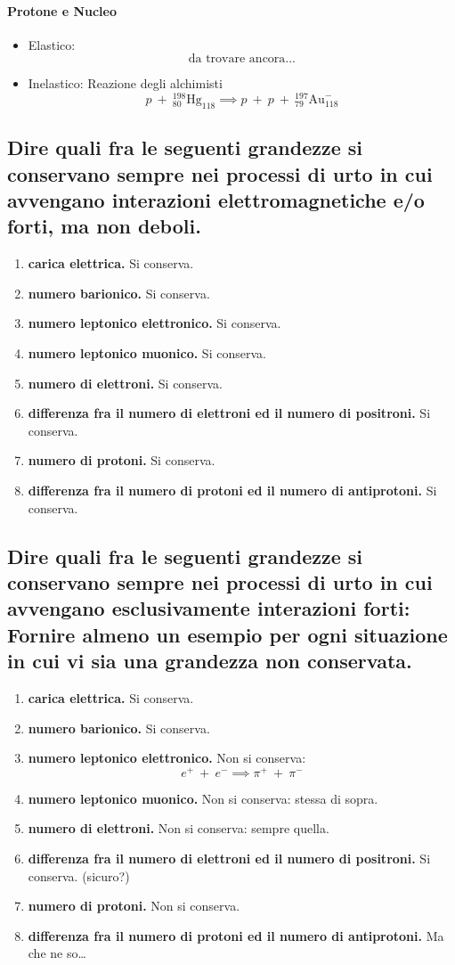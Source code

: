 \paragraph{Protone e Nucleo}
\begin{itemize}
	\item Elastico: 
	\[
		\text{da trovare ancora\ldots}
	\]
	\item Inelastico: Reazione degli alchimisti
	\[
		p \ + \ {}^{198}_{80}\text{Hg}_{118} \implies p \ + \ p \ + \ {}^{197}_{79}\text{Au}^{-}_{118} 
	\] 
\end{itemize}
\subsection[]{ Dire quali fra le seguenti grandezze si conservano sempre nei processi di urto in cui avvengano interazioni elettromagnetiche e/o forti, ma non deboli.} 
\begin{enumerate}
	\item \textbf{carica elettrica.} Si conserva.
	\item \textbf{numero barionico.} Si conserva.
	\item \textbf{numero leptonico elettronico.} Si conserva. 
	\item \textbf{numero leptonico muonico.} Si conserva.
	\item \textbf{numero di elettroni.} Si conserva.
	\item \textbf{differenza fra il numero di elettroni ed il numero di positroni.} Si conserva.
	\item \textbf{numero di protoni.} Si conserva.
	\item \textbf{differenza fra il numero di protoni ed il numero di antiprotoni.} Si conserva.
\end{enumerate}


\subsection[]{ Dire quali fra le seguenti grandezze si conservano sempre nei processi di urto in cui avvengano esclusivamente interazioni forti:  Fornire almeno un esempio per ogni situazione in cui vi sia una grandezza non conservata.}
\begin{enumerate}
	\item \textbf{carica elettrica.} Si conserva.
	\item \textbf{numero barionico.} Si conserva.
	\item \textbf{numero leptonico elettronico.} Non si conserva:
	\[
		e^+ \ + \ e^- \implies \pi^+ \ + \ \pi^-
	\]
	\item \textbf{numero leptonico muonico.} Non si conserva: stessa di sopra.
	\item \textbf{numero di elettroni.} Non si conserva: sempre quella.
	\item \textbf{differenza fra il numero di elettroni ed il numero di positroni.} Si conserva. (sicuro?) 
	\item \textbf{numero di protoni.} Non si conserva.
	\item \textbf{differenza fra il numero di protoni ed il numero di antiprotoni.} Ma che ne so\ldots
\end{enumerate}


